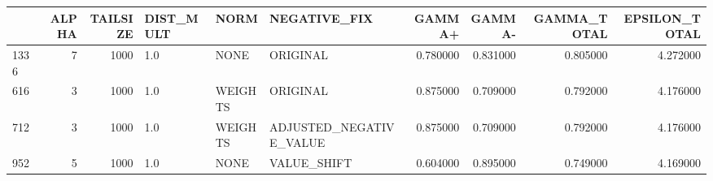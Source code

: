 \begin{tabular}{lrrlllrrrr}
\toprule
 & ALPHA & TAILSIZE & DIST_MULT & NORM & NEGATIVE_FIX & GAMMA+ & GAMMA- & GAMMA_TOTAL & EPSILON_TOTAL \\
\midrule
1336 & 7 & 1000 & 1.0 & NONE & ORIGINAL & 0.780000 & 0.831000 & 0.805000 & 4.272000 \\
616 & 3 & 1000 & 1.0 & WEIGHTS & ORIGINAL & 0.875000 & 0.709000 & 0.792000 & 4.176000 \\
712 & 3 & 1000 & 1.0 & WEIGHTS & ADJUSTED_NEGATIVE_VALUE & 0.875000 & 0.709000 & 0.792000 & 4.176000 \\
952 & 5 & 1000 & 1.0 & NONE & VALUE_SHIFT & 0.604000 & 0.895000 & 0.749000 & 4.169000 \\
\bottomrule
\end{tabular}
